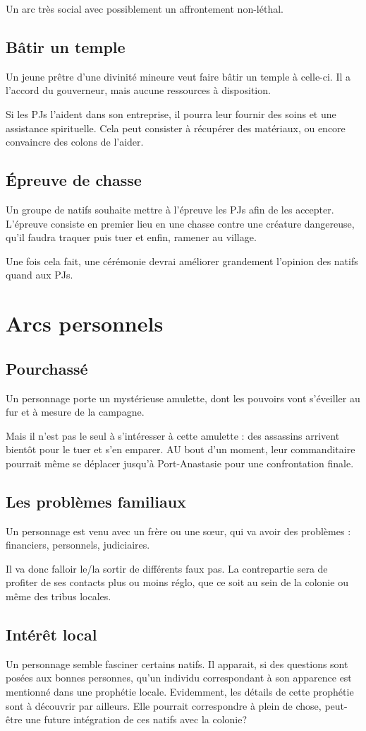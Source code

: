 \documentclass[10pt,a4paper]{book}
\begin{document}
Un arc très social avec possiblement un affrontement non-léthal.
\subsection{Bâtir un temple}
Un jeune prêtre d'une divinité mineure veut faire bâtir un temple à celle-ci. Il a l'accord du gouverneur, mais aucune ressources à disposition.

Si les PJs l'aident dans son entreprise, il pourra leur fournir des soins et une assistance spirituelle. Cela peut consister à récupérer des matériaux, ou encore convaincre des colons de l'aider.
\subsection{Épreuve de chasse}
Un groupe de natifs souhaite mettre à l'épreuve les PJs afin de les accepter. L'épreuve consiste en premier lieu en une chasse contre une créature dangereuse, qu'il faudra traquer puis tuer et enfin, ramener au village. 

Une fois cela fait, une cérémonie devrai améliorer grandement l'opinion des natifs quand aux PJs.
\section{Arcs personnels}
\subsection{Pourchassé}
Un personnage porte un mystérieuse amulette, dont les pouvoirs vont s'éveiller au fur et à mesure de la campagne. 

Mais il n'est pas le seul à s'intéresser à cette amulette : des assassins arrivent bientôt pour le tuer et s'en emparer. AU bout d'un moment, leur commanditaire pourrait même se déplacer jusqu'à Port-Anastasie pour une confrontation finale.
\subsection{Les problèmes familiaux}
Un personnage est venu avec un frère ou une sœur, qui va avoir des problèmes : financiers, personnels, judiciaires.

Il va donc falloir le/la sortir de différents faux pas. La contrepartie sera de profiter de ses contacts plus ou moins réglo, que ce soit au sein de la colonie ou même des tribus locales.
\subsection{Intérêt local}
Un personnage semble fasciner certains natifs. Il apparait, si des questions sont posées aux bonnes personnes, qu'un individu correspondant à son apparence est mentionné dans une prophétie locale. Evidemment, les détails de cette prophétie sont à découvrir par ailleurs.
Elle pourrait correspondre à plein de chose, peut-être une future intégration de ces natifs avec la colonie?
\end{document}
